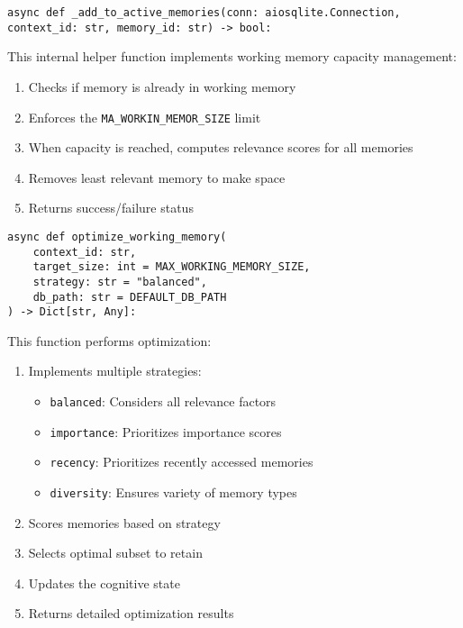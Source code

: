 \documentclass[12pt,a4paper]{article}
\newcommand{\code}[1]{\texttt{#1}}
\begin{document}
\begin{pageablecode}
\begin{verbatim}
async def _add_to_active_memories(conn: aiosqlite.Connection, context_id: str, memory_id: str) -> bool:
\end{verbatim}
\end{pageablecode}
This internal helper function implements working memory capacity management:
\begin{enumerate}[label=\arabic*.]
    \item Checks if memory is already in working memory
    \item Enforces the \code{MA\1\_WORKIN\1\_MEMOR\1\_SIZE} limit
    \item When capacity is reached, computes relevance scores for all memories
    \item Removes least relevant memory to make space
    \item Returns success/failure status
\end{enumerate}

\begin{pageablecode}
\begin{verbatim}
async def optimize_working_memory(
    context_id: str,
    target_size: int = MAX_WORKING_MEMORY_SIZE,
    strategy: str = "balanced",
    db_path: str = DEFAULT_DB_PATH
) -> Dict[str, Any]:
\end{verbatim}
\end{pageablecode}
This function performs optimization:
\begin{enumerate}[label=\arabic*.]
    \item Implements multiple strategies:
    \begin{itemize}
        \item \code{balanced}: Considers all relevance factors
        \item \code{importance}: Prioritizes importance scores
        \item \code{recency}: Prioritizes recently accessed memories
        \item \code{diversity}: Ensures variety of memory types
    \end{itemize}
    \item Scores memories based on strategy
    \item Selects optimal subset to retain
    \item Updates the cognitive state
    \item Returns detailed optimization results
\end{enumerate}
\end{document}
